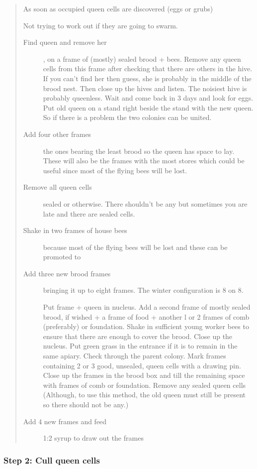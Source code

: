 \begin{quotation}
As soon as occupied queen cells are discovered (eggs or grubs)

Not trying to work out if they are going to swarm.
\begin{description}
  \item[Find queen and remove her], on a frame of (mostly) sealed brood + bees. Remove any queen cells from this frame after checking that there are others in the hive.
	If you can't find her  then guess, she is probably in the middle of the brood nest.
	Then close up the hives and listen.  The noisiest hive is probably queenless.
	Wait and come back in 3 days and look for eggs.
	Put old queen on a stand right beside the stand with the new queen.
	So if there is a problem the two colonies can be united.
  \item[Add four other frames] the ones bearing the least brood so the queen has space to lay.
	These will also be the frames with the most stores which could be useful since most of the flying bees will be lost.
  \item[Remove all queen cells] sealed or otherwise.  There shouldn't be any but sometimes you are late and there are sealed cells.
  \item[Shake in two frames of house bees] because most of the flying bees will be lost and these can be promoted to 
  \item[Add three new brood frames] bringing it up to eight frames.  The winter configuration is 8 on 8.
  
  
Put frame + queen in nucleus.
Add a second frame of mostly sealed brood, if wished + a frame of food + another l or 2
frames of comb (preferably) or foundation.
Shake in sufficient young worker bees to ensure that there are enough to cover the brood.
Close up the nucleus. Put green grass in the entrance if it is to remain in the same apiary.
Check through the parent colony.  Mark frames containing 2 or 3 good, unsealed, queen cells with a drawing pin.
Close up the frames in the brood box and till the remaining space with frames of comb or foundation.
	Remove any sealed queen cells (Although, to use this method, the old queen must still be present so there should not be any.)
  \item[Add 4 new frames and feed] 1:2 syrup to draw out the frames
 \end{description}
\end{quotation}
 
\subsubsection*{Step 2: Cull queen cells}


